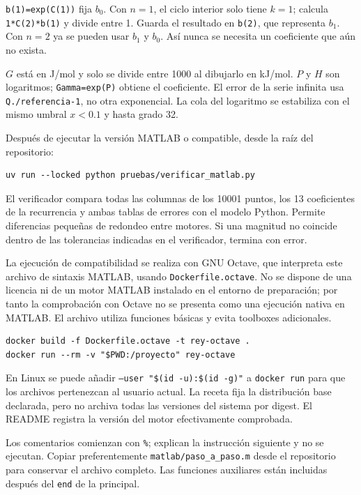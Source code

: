\texttt{b(1)=exp(C(1))} fija $b_0$. Con $n=1$, el ciclo interior solo tiene $k=1$; calcula \texttt{1*C(2)*b(1)} y divide entre 1. Guarda el resultado en \texttt{b(2)}, que representa $b_1$. Con $n=2$ ya se pueden usar $b_1$ y $b_0$. Así nunca se necesita un coeficiente que aún no exista.

$G$ está en J/mol y solo se divide entre 1000 al dibujarlo en kJ/mol. $P$ y $H$ son logaritmos; \texttt{Gamma=exp(P)} obtiene el coeficiente. El error de la serie infinita usa \texttt{Q./referencia-1}, no otra exponencial. La cola del logaritmo se estabiliza con el mismo umbral $x<0.1$ y hasta grado 32.

Después de ejecutar la versión MATLAB o compatible, desde la raíz del repositorio:
\begin{verbatim}
uv run --locked python pruebas/verificar_matlab.py
\end{verbatim}
El verificador compara todas las columnas de los 10001 puntos, los 13 coeficientes de la recurrencia y ambas tablas de errores con el modelo Python. Permite diferencias pequeñas de redondeo entre motores. Si una magnitud no coincide dentro de las tolerancias indicadas en el verificador, termina con error.

La ejecución de compatibilidad se realiza con GNU Octave, que interpreta este archivo de sintaxis MATLAB, usando \texttt{Dockerfile.octave}. No se dispone de una licencia ni de un motor MATLAB instalado en el entorno de preparación; por tanto la comprobación con Octave no se presenta como una ejecución nativa en MATLAB. El archivo utiliza funciones básicas y evita toolboxes adicionales.
\begin{verbatim}
docker build -f Dockerfile.octave -t rey-octave .
docker run --rm -v "$PWD:/proyecto" rey-octave
\end{verbatim}
En Linux se puede añadir \texttt{--user "\$(id -u):\$(id -g)"} a \texttt{docker run} para que los archivos pertenezcan al usuario actual. La receta fija la distribución base declarada, pero no archiva todas las versiones del sistema por digest. El README registra la versión del motor efectivamente comprobada.

Los comentarios comienzan con \texttt{\%}; explican la instrucción siguiente y no se ejecutan. Copiar preferentemente \texttt{matlab/paso\_a\_paso.m} desde el repositorio para conservar el archivo completo. Las funciones auxiliares están incluidas después del \texttt{end} de la principal.

